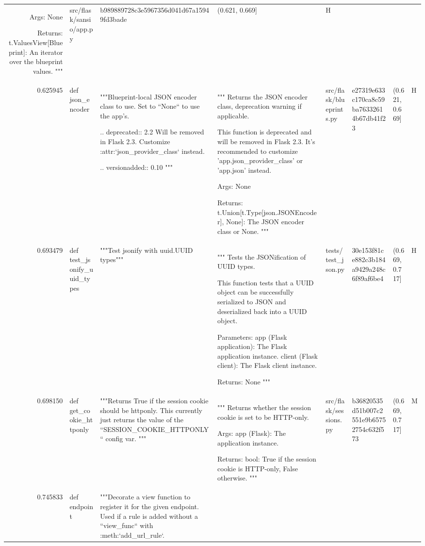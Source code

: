 \begin{tabular}{rlllllll}
Args:
    None

Returns:
    t.ValuesView[Blueprint]: An iterator over the blueprint values.
""" & src/flask/sansio/app.py & b989889728c3e5967356d041d67a15949fd3bade & (0.621, 0.669] & H \\
0.625945 & def json_encoder & """Blueprint-local JSON encoder class to use. Set to ``None`` to use the app's.

        .. deprecated:: 2.2
             Will be removed in Flask 2.3. Customize
             :attr:`json_provider_class` instead.

        .. versionadded:: 0.10
        """ & """
Returns the JSON encoder class, deprecation warning if applicable.

This function is deprecated and will be removed in Flask 2.3. It's recommended to customize 'app.json_provider_class' or 'app.json' instead.

Args:
    None

Returns:
    t.Union[t.Type[json.JSONEncoder], None]: The JSON encoder class or None.
""" & src/flask/blueprints.py & e27319e633c170ca8c59ba76332614b67db41f23 & (0.621, 0.669] & H \\
0.693479 & def test_jsonify_uuid_types & """Test jsonify with uuid.UUID types""" & """
Tests the JSONification of UUID types.

This function tests that a UUID object can be successfully serialized to JSON and deserialized back into a UUID object.

Parameters:
app (Flask application): The Flask application instance.
client (Flask client): The Flask client instance.

Returns:
None
""" & tests/test_json.py & 30e153f81ce882c3b184a9429a248c6f89af6be4 & (0.669, 0.717] & H \\
0.698150 & def get_cookie_httponly & """Returns True if the session cookie should be httponly.  This
        currently just returns the value of the ``SESSION_COOKIE_HTTPONLY``
        config var.
        """ & """
Returns whether the session cookie is set to be HTTP-only.

Args:
    app (Flask): The application instance.

Returns:
    bool: True if the session cookie is HTTP-only, False otherwise.
""" & src/flask/sessions.py & b36820535d51b007c2551e9b65752754c632f573 & (0.669, 0.717] & M \\
0.745833 & def endpoint & """Decorate a view function to register it for the given
        endpoint. Used if a rule is added without a ``view_func`` with
        :meth:`add_url_rule`.


\end{tabular}
